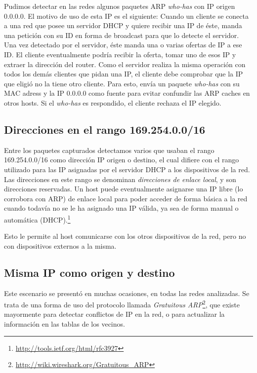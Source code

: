 \documentclass[a4paper, 10pt, twoside]{article}
\begin{document}
Pudimos detectar en las redes algunos paquetes ARP \textit{who-has} con IP origen 0.0.0.0.
El motivo de uso de esta IP es el siguiente:
Cuando un cliente se conecta a una red que posee un servidor DHCP y quiere recibir una IP de éste, manda una petición con su ID en forma de broadcast para que lo detecte el servidor. Una vez detectado por el servidor, éste manda una o varias ofertas de IP a ese ID.
El cliente eventualmente podría recibir la oferta, tomar uno de esos IP y extraer la dirección del router.
Como el servidor realiza la misma operación con todos los demás clientes que pidan una IP, el cliente debe comprobar que la IP que eligió no la tiene otro cliente. Para esto, envía un paquete \textit{who-has} con su MAC adress y la IP 0.0.0.0 como fuente para evitar confundir las ARP caches en otros hosts. Si el \textit{who-has} es respondido, el cliente rechaza el IP elegido.



\subsection{Direcciones en el rango 169.254.0.0/16}

Entre los paquetes capturados detectamos varios que usaban el rango 169.254.0.0/16 como dirección IP origen o destino, el cual difiere con el rango utilizado para las IP asignadas por el servidor DHCP a los dispositivos de la red. Las direcciones en este rango se denominan \textit{direcciones de enlace local}, y son direcciones reservadas. Un host puede eventualmente asignarse una IP libre (lo corrobora con ARP) de enlace local para poder acceder de forma básica a la red cuando todavía no se le ha asignado una IP válida, ya sea de forma manual o automática (DHCP).\footnote{\url{http://tools.ietf.org/html/rfc3927}}

Esto le permite al host comunicarse con los otros dispositivos de la red, pero no con dispositivos externos a la misma.


\subsection{Misma IP como origen y destino}

Este escenario se presentó en muchas ocasiones, en todas las redes analizadas. Se trata de una forma de uso del protocolo llamada \textit{Gratuitous ARP}\footnote{\url{http://wiki.wireshark.org/Gratuitous_ARP}}, que existe mayormente para detectar conflictos de IP en la red, o para actualizar la información en las tablas de los vecinos.
\end{document}
